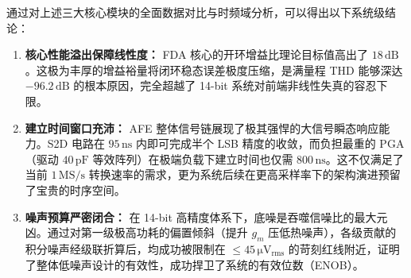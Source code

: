 通过对上述三大核心模块的全面数据对比与时频域分析，可以得出以下系统级结论：
\begin{enumerate}
    \item \textbf{核心性能溢出保障线性度：} FDA 核心的开环增益比理论目标值高出了 $18\,\mathrm{dB}$。这极为丰厚的增益裕量将闭环稳态误差极度压缩，是满量程 THD 能够深达 $-96.2\,\mathrm{dB}$ 的根本原因，完全超越了 14-bit 系统对前端非线性失真的容忍下限。
    \item \textbf{建立时间窗口充沛：} AFE 整体信号链展现了极其强悍的大信号瞬态响应能力。S2D 电路在 $95\,\mathrm{ns}$ 内即可完成半个 LSB 精度的收敛，而负担最重的 PGA（驱动 $40\,\mathrm{pF}$ 等效阵列）在极端负载下建立时间也仅需 $800\,\mathrm{ns}$。这不仅满足了当前 $1\,\mathrm{MS/s}$ 转换速率的需求，更为系统后续在更高采样率下的架构演进预留了宝贵的时序空间。
    \item \textbf{噪声预算严密闭合：} 在 14-bit 高精度体系下，底噪是吞噬信噪比的最大元凶。通过对第一级极高功耗的偏置倾斜（提升 $g_m$ 压低热噪声），各级贡献的积分噪声经级联折算后，均成功被限制在 $\le 45\,\mathrm{\mu V_{rms}}$ 的苛刻红线附近，证明了整体低噪声设计的有效性，成功捍卫了系统的有效位数（ENOB）。
\end{enumerate}

